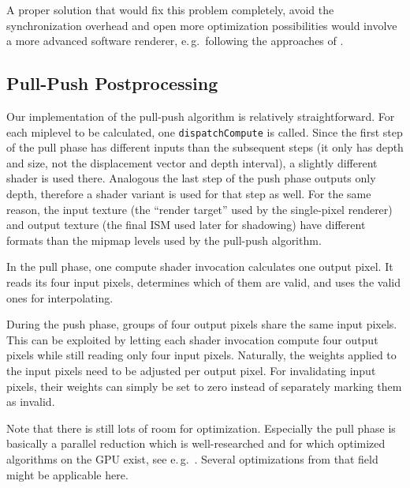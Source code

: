 A proper solution that would fix this problem completely, avoid the synchronization overhead and open more optimization possibilities would involve a more advanced software renderer, e.\,g.\ following the approaches of \citet{Laine:2011:SoftwareRasterization}.


\subsection{Pull-Push Postprocessing}
\label{sec:impl:pullPushPostprocessing}

Our implementation of the pull-push algorithm is relatively straightforward. For each miplevel to be calculated, one \texttt{dispatchCompute} is called. Since the first step of the pull phase has different inputs than the subsequent steps (it only has depth and size, not the displacement vector and depth interval), a slightly different shader is used there. Analogous the last step of the push phase outputs only depth, therefore a shader variant is used for that step as well. For the same reason, the input texture (the ``render target'' used by the single-pixel renderer) and output texture (the final ISM used later for shadowing) have different formats than the mipmap levels used by the pull-push algorithm.



In the pull phase, one compute shader invocation calculates one output pixel. It reads its four input pixels, determines which of them are valid, and uses the valid ones for interpolating.


During the push phase, groups of four output pixels share the same input pixels. This can be exploited by letting each shader invocation compute four output pixels while still reading only four input pixels. Naturally, the weights applied to the input pixels need to be adjusted per output pixel. For invalidating input pixels, their weights can simply be set to zero instead of separately marking them as invalid.


Note that there is still lots of room for optimization. Especially the pull phase is basically a parallel reduction which is well-researched and for which optimized algorithms on the GPU exist, see e.\,g.\ \citet{Harris:2007:ParallelReduction}. Several optimizations from that field might be applicable here.



